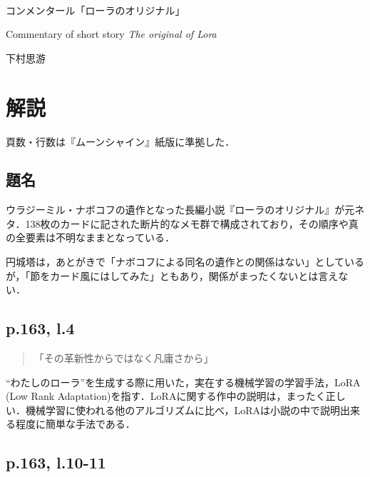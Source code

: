 \documentclass[10pt, a5paper, twoside]{jsarticle}
\theoremstyle{definition}
\begin{document}
	~ %

	\begin{center}

		\Large{コンメンタール「ローラのオリジナル」}

		\vspace{3mm}

		\large{Commentary of short story \textit{The original of Lora}}

		\vspace{3mm}
		
		\large{下村思游}

	\end{center}

	\vspace{3mm}

	\section{解説}

		頁数・行数は『ムーンシャイン』紙版\cite{moonshine}に準拠した．

		\subsection{題名}

			ウラジーミル・ナボコフの遺作となった長編小説『ローラのオリジナル』\cite{laula}が元ネタ．138枚のカードに記された断片的なメモ群で構成されており，その順序や真の全要素は不明なままとなっている．

			円城塔は，あとがきで「ナボコフによる同名の遺作との関係はない」としているが，「節をカード風にはしてみた」ともあり，関係がまったくないとは言えない．

		\subsection{p.163, l.4}

			\begin{quote}
				
				「その革新性からではなく凡庸さから」

			\end{quote}

			“わたしのローラ”を生成する際に用いた，実在する機械学習の学習手法，LoRA (Low Rank Adaptation)\cite{lora}を指す．LoRAに関する作中の説明は，まったく正しい．機械学習に使われる他のアルゴリズムに比べ，LoRAは小説の中で説明出来る程度に簡単な手法である．

		\subsection{p.163, l.10-11}
\end{document}
